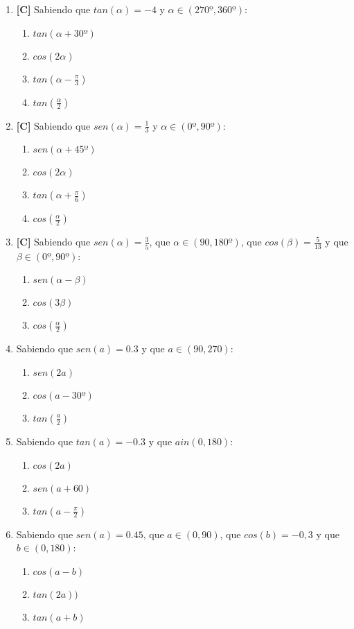 \begin{enumerate}[topsep=0pt]
	\item \textbf{[C]} Sabiendo que $tan(\alpha) = -4$ y $\alpha \in (270º,360º)$:
		\begin{enumerate}[topsep=0pt, label=\arabic*)]
		\item  $tan(\alpha + 30º)$
		\item $cos(2\alpha)$
		\item $tan(\alpha - \frac{\pi}{3})$
		\item $tan(\frac{\alpha}{2})$
		\end{enumerate}

	\item \textbf{[C]} Sabiendo que $sen(\alpha) = \frac{1}{3}$ y $\alpha \in (0º,90º)$:
		\begin{enumerate}[topsep=0pt, label=\arabic*)]
		\item $sen(\alpha + 45º)$
		\item $cos(2\alpha)$
		\item $tan(\alpha + \frac{\pi}{6})$
		\item $cos(\frac{\alpha}{2})$
		\end{enumerate}
	\item \textbf{[C]} Sabiendo que $sen(\alpha) = \frac{3}{5}$, que $\alpha \in (90,180º)$, que $cos(\beta) = \frac{5}{13}$ y que $ \beta \in (0º,90º)$:
		\begin{enumerate}[topsep=0pt, label=\arabic*)]
		\item $sen(\alpha - \beta)$
		\item $cos(3\beta)$
		\item $cos(\frac{\alpha}{2})$
		\end{enumerate}
	
	\item Sabiendo que $sen(a)=0.3$ y que $a \in (90,270)$:
		\begin{enumerate}[topsep=0pt, label=\arabic*)]
		\item $sen(2a)$
		\item $cos(a - 30º)$
		\item $tan(\frac{a}{2})$
		\end{enumerate}
	
	\item Sabiendo que $tan(a) = -0.3$ y que $a in (0,180)$:
	\begin{enumerate}[topsep=0pt, label=\arabic*)]
		\item $cos(2a)$
		\item $sen(a+60)$
		\item $tan(a - \frac{\pi}{2})$
	\end{enumerate}
	
	\item Sabiendo que $sen(a) = 0.45$, que $a \in (0,90)$, que $cos(b) = -0,3$ y que $b \in (0,180)$:
	\begin{enumerate}[topsep=0pt, label=\arabic*)]
		\item $cos(a-b)$
		\item $tan(2a))$
		\item $tan(a+b)$
	\end{enumerate}
\end{enumerate}


